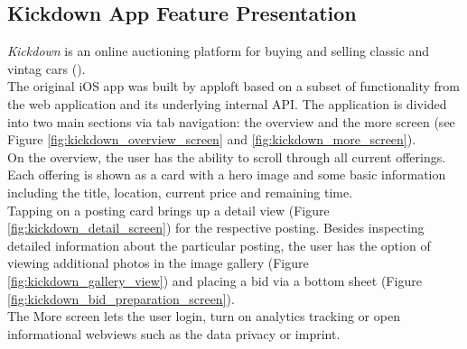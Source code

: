 \subsection{Kickdown App Feature Presentation} \label{section:kickdown_feature_presentation}
\textit{Kickdown} is an online auctioning platform for buying and selling classic and vintag cars (\cite{Kickdown2021}).\\
The original iOS app was built by apploft based on a subset of functionality from the web application and its underlying internal API.
The application is divided into two main sections via tab navigation: the overview and the more screen (see Figure \ref{fig:kickdown_overview_screen} and \ref{fig:kickdown_more_screen}).\\
On the overview, the user has the ability to scroll through all current offerings. Each offering is shown as a card with a hero image 
and some basic information including the title, location, current price and remaining time.\\
Tapping on a posting card brings up a detail view (Figure \ref{fig:kickdown_detail_screen}) for the respective posting.
Besides inspecting detailed information about the particular posting, the user has the option of viewing additional photos in the image gallery (Figure \ref{fig:kickdown_gallery_view}) and placing a bid via a bottom sheet (Figure \ref{fig:kickdown_bid_preparation_screen}).\\
The More screen lets the user login, turn on analytics tracking or open informational webviews such as the data privacy or imprint.






